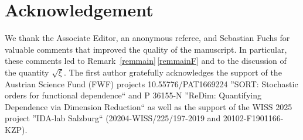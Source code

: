 \documentclass{article}
\theoremstyle{plain}
\theoremstyle{definition}
\begin{document}




\section*{Acknowledgement}

We thank the Associate Editor, an anonymous referee, and Sebastian Fuchs for valuable comments that improved the quality of the manuscript.
In particular, these comments led to Remark~\ref{remmain}\,\ref{remmainF} and to the discussion of the quantity \(\sqrt{\xi}\).
The first author gratefully acknowledges the support of the Austrian Science Fund (FWF) projects 10.55776/PAT1669224 ''SORT: Stochastic orders for functional dependence`` and
{P 36155-N} ''ReDim: Quantifying Dependence via Dimension Reduction`` as well as the support of the WISS 2025 project ''IDA-lab Salzburg`` (20204-WISS/225/197-2019 and 20102-F1901166-KZP).




\end{document}
